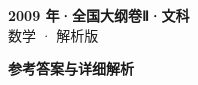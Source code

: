 \documentclass[zihao=-4, a4paper]{ctexart}
\begin{document}
\begin{center}
  {\Large\bfseries 2009 年·全国大纲卷Ⅱ·文科}\\[4pt]
  {\large 数学 · 解析版}
\end{center}
\medskip
{}

\clearpage
{}
\begin{center}{\Large\bfseries 参考答案与详细解析}\end{center}
\medskip

\end{document}
